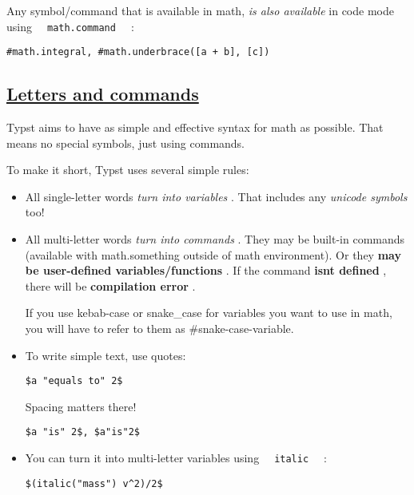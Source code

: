 Any symbol/command that is available in math, \emph{is also available}
in code mode using \texttt{\ }{\texttt{\ math.command\ }}\texttt{\ } :

\begin{verbatim}
#math.integral, #math.underbrace([a + b], [c])
\end{verbatim}

\pandocbounded{}

\subsection{\texorpdfstring{\hyperref[letters-and-commands]{Letters and
commands}}{Letters and commands}}\label{letters-and-commands}

Typst aims to have as simple and effective syntax for math as possible.
That means no special symbols, just using commands.

To make it short, Typst uses several simple rules:

\begin{itemize}
\item
  All single-letter words \emph{turn into variables} . That includes any
  \emph{unicode symbols} too!
\item
  All multi-letter words \emph{turn into commands} . They may be
  built-in commands (available with math.something outside of math
  environment). Or they \textbf{may be user-defined variables/functions}
  . If the command \textbf{isn\textquotesingle t defined} , there will
  be \textbf{compilation error} .

  If you use kebab-case or snake\_case for variables you want to use in
  math, you will have to refer to them as \#snake-case-variable.
\item
  To write simple text, use quotes:

\begin{verbatim}
$a "equals to" 2$
\end{verbatim}

  \pandocbounded{}

  Spacing matters there!

\begin{verbatim}
$a "is" 2$, $a"is"2$
\end{verbatim}

  \pandocbounded{}
\item
  You can turn it into multi-letter variables using
  \texttt{\ }{\texttt{\ italic\ }}\texttt{\ } :

\begin{verbatim}
$(italic("mass") v^2)/2$
\end{verbatim}

  \pandocbounded{}
\end{itemize}


